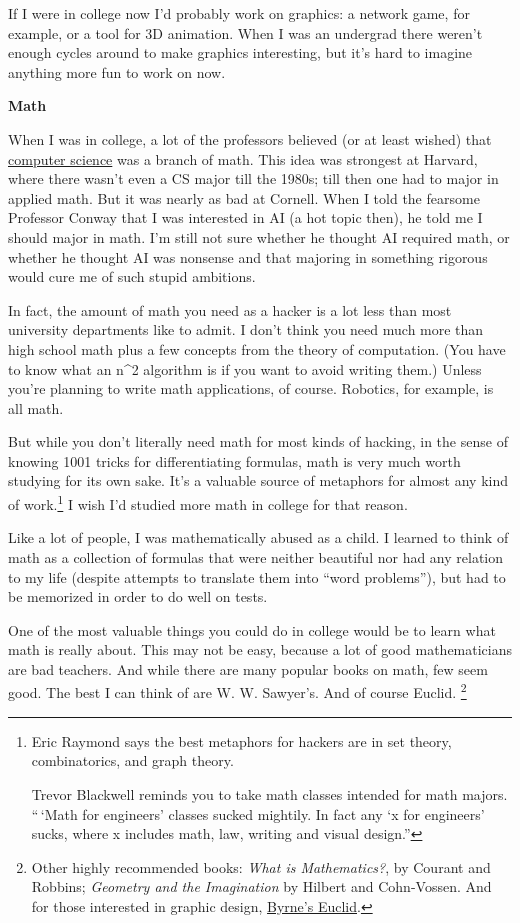 If I were in college now I'd probably work on graphics: a network game,
for example, or a tool for 3D animation. When I was an undergrad there
weren't enough cycles around to make graphics interesting, but it's hard
to imagine anything more fun to work on now.

\textbf{Math}

When I was in college, a lot of the professors believed (or at least
wished) that \href{hp.html}{computer science} was a branch of math. This
idea was strongest at Harvard, where there wasn't even a CS major till
the 1980s; till then one had to major in applied math. But it was nearly
as bad at Cornell. When I told the fearsome Professor Conway that I was
interested in AI (a hot topic then), he told me I should major in math.
I'm still not sure whether he thought AI required math, or whether he
thought AI was nonsense and that majoring in something rigorous would
cure me of such stupid ambitions.

In fact, the amount of math you need as a hacker is a lot less than most
university departments like to admit. I don't think you need much more
than high school math plus a few concepts from the theory of
computation. (You have to know what an n\^{}2 algorithm is if you want
to avoid writing them.) Unless you're planning to write math
applications, of course. Robotics, for example, is all math.

But while you don't literally need math for most kinds of hacking, in
the sense of knowing 1001 tricks for differentiating formulas, math is
very much worth studying for its own sake. It's a valuable source of
metaphors for almost any kind of work.\footnote{Eric Raymond says the best metaphors for hackers are in set
theory, combinatorics, and graph theory.

Trevor Blackwell reminds you to take math classes intended for math
majors. ``\,`Math for engineers' classes sucked mightily. In fact any `x
for engineers' sucks, where x includes math, law, writing and visual
design.''} I wish I'd studied more
math in college for that reason.

Like a lot of people, I was mathematically abused as a child. I learned
to think of math as a collection of formulas that were neither beautiful
nor had any relation to my life (despite attempts to translate them into
``word problems''), but had to be memorized in order to do well on
tests.

One of the most valuable things you could do in college would be to
learn what math is really about. This may not be easy, because a lot of
good mathematicians are bad teachers. And while there are many popular
books on math, few seem good. The best I can think of are W. W.
Sawyer's. And of course Euclid. \footnote{Other highly recommended books: \emph{What is Mathematics?}, by
Courant and Robbins; \emph{Geometry and the Imagination} by Hilbert and
Cohn-Vossen. And for those interested in graphic design,
\href{http://www.math.ubc.ca/people/faculty/cass/Euclid/byrne.html}{Byrne's
Euclid}.}

